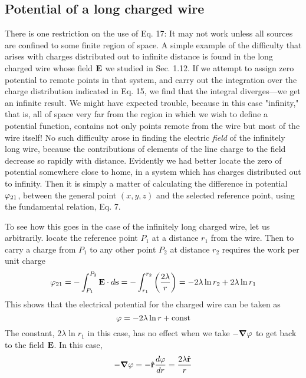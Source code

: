 \subsection{Potential of a long charged wire}

There is one restriction on the
use of Eq. 17: It may not work unless all sources are confined to some
finite region of space. A simple example of the difficulty that arises
with charges distributed out to infinite distance is found in the long
charged wire whose field $\mathbf{E}$ we studied in Sec. 1.12. If we attempt to
assign zero potential to remote points in that system, and carry out
the integration over the charge distribution indicated in Eq. 15, we
find that the integral diverges---we get an infinite result. We might
have expected trouble, because in this case "infinity," that is, all of
space very far from the region in which we wish to define a potential
function, contains not only points remote from the wire but most of
the wire itself! No such difficulty arose in finding the electric \emph{field} of
the infinitely long wire, because the contributions of elements of the
line charge to the field decrease so rapidly with distance. Evidently
we had better locate the zero of potential somewhere close to home,
in a system which has charges distributed out to infinity. Then it is
simply a matter of calculating the difference in potential $\varphi_{21}$, between
the general point $(x,y,z)$ and the selected reference point, using the
fundamental relation, Eq. 7.

To see how this goes in the case of the infinitely long charged wire,
let us arbitrarily. locate the reference point $P_1$ at a distance $r_1$ from
the wire. Then to carry a charge from $P_1$ to any other point $P_2$ at
distance $r_2$ requires the work per unit charge
\begin{equation}
  \varphi_{21} = -\int_{P_1}^{P_2} \mathbf{E}\cdot d\mathbf{s}
            = -\int_{r_1}^{r_2} \left(\frac{2\lambda}{r}\right)
            = -2\lambda\ln r_2 + 2\lambda \ln r_1
\end{equation}
This shows that the electrical potential for the charged wire can be
taken as
\begin{equation}
  \varphi = -2\lambda\ln r + \text{const}
\end{equation}
The constant, $2\lambda\ln r_1$ in this case, has no effect when we take $-\boldsymbol{\nabla}\varphi$
to get back to the field $\mathbf{E}$. In this case,
\begin{equation}
  -\boldsymbol{\nabla}\varphi = -\hat{\mathbf{r}}\frac{d\varphi}{d r} = \frac{2\lambda\hat{\mathbf{r}}}{r}
\end{equation}


